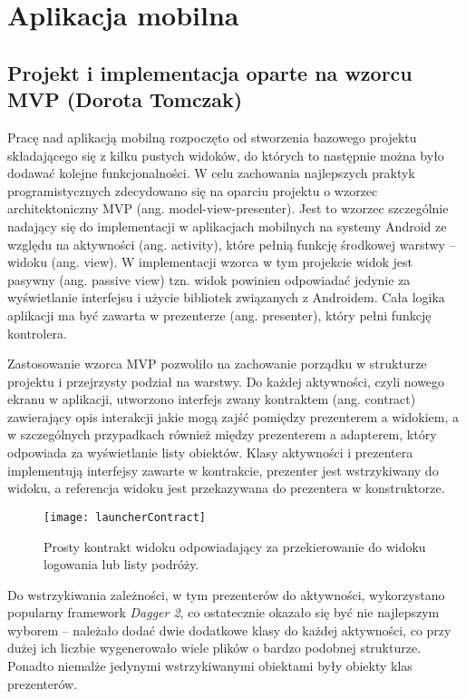\chapter{Aplikacja mobilna}

\section{Projekt i implementacja oparte na wzorcu MVP (Dorota Tomczak)}
\par Pracę nad aplikacją mobilną rozpoczęto od stworzenia bazowego projektu składającego się z kilku pustych widoków, do których to następnie można było dodawać kolejne funkcjonalności. W celu zachowania najlepszych praktyk programistycznych zdecydowano się na oparciu projektu o wzorzec architektoniczny MVP (ang. model-view-presenter). Jest to wzorzec szczególnie nadający się do implementacji w aplikacjach mobilnych na systemy Android ze względu na aktywności (ang. activity), które pełnią funkcję środkowej warstwy – widoku (ang. view). W implementacji wzorca w tym projekcie widok jest pasywny (ang. passive view) tzn. widok powinien odpowiadać jedynie za wyświetlanie interfejsu i użycie bibliotek związanych z Androidem. Cała logika aplikacji ma być zawarta w prezenterze (ang. presenter), który pełni funkcję kontrolera.

\par Zastosowanie wzorca MVP pozwoliło na zachowanie porządku w strukturze projektu i przejrzysty podział na warstwy. Do każdej aktywności, czyli nowego ekranu w aplikacji, utworzono interfejs zwany kontraktem (ang. contract) zawierający opis interakcji jakie mogą zajść pomiędzy prezenterem a widokiem, a w szczególnych przypadkach również między prezenterem a adapterem, który odpowiada za wyświetlanie listy obiektów. Klasy aktywności i prezentera implementują interfejsy zawarte w kontrakcie, prezenter jest wstrzykiwany do widoku, a referencja widoku jest przekazywana do prezentera w konstruktorze.

\begin{figure}[h]
\centering
\texttt{[image: launcherContract]}
\caption{Prosty kontrakt widoku odpowiadający za przekierowanie do widoku logowania lub listy podróży.}
\label{fig:launcherContract}
\end{figure}
\FloatBarrier

\par Do wstrzykiwania zależności, w tym prezenterów do aktywności, wykorzystano popularny framework \textit{Dagger 2}\cite{Dagger 2}, co ostatecznie okazało się być nie najlepszym wyborem – należało dodać dwie dodatkowe klasy do każdej aktywności, co przy dużej ich liczbie wygenerowało wiele plików o bardzo podobnej strukturze. Ponadto niemalże jedynymi wstrzykiwanymi obiektami były obiekty klas prezenterów. 

